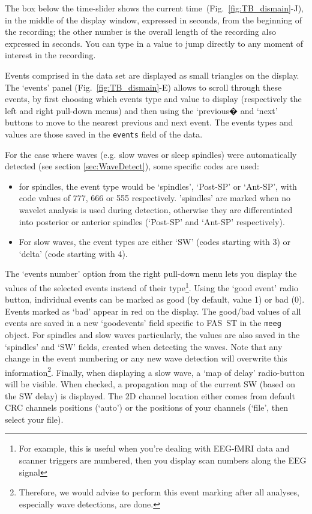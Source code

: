 \documentclass[a4paper,titlepage]{article}
\def\dblS{\hbox{S\hskip -4.5pt S}}
\newcommand{\bi}{\begin{itemize}}
\newcommand{\ei}{\end{itemize}}
\newcommand{\fasst}{FA\dblS T } 	%
\begin{document}
The box below the time-slider shows the current time~(Fig.~\ref{fig:TB_dismain}-J), in the middle of the display window, expressed in seconds, from the beginning of the recording; the other number is the overall length of the recording also expressed in seconds. You can type in a value to jump directly to any moment of interest in the recording.

Events comprised in the data set are displayed as small triangles on the display. The `events' panel  (Fig.~\ref{fig:TB_dismain}-E) allows to scroll through these events, by first choosing which events type and value to display (respectively the left and right pull-down menus) and then using the `previous� and `next' buttons to move to the nearest previous and next event. The events types and values are those saved in the {\tt events} field of the data.

For the case where waves (e.g. slow waves or sleep spindles) were automatically detected (see section \ref{sec:WaveDetect}), some specific codes are used:
\bi
\item for spindles, the event type would be `spindles', `Post-SP' or `Ant-SP', with code values of 777, 666 or 555 respectively. 'spindles' are marked when no wavelet analysis is used during detection, otherwise they are differentiated into posterior or anterior spindles (`Post-SP' and `Ant-SP' respectively). 
\item For slow waves, the event types are either `SW' (codes starting with 3) or `delta' (code starting with 4). 
\ei
The `events number' option from the right pull-down menu lets you display the values of the selected events instead of their type\footnote{For example, this is useful when you're dealing with EEG-fMRI data and scanner triggers are numbered, then you display scan numbers along the EEG signal}. Using the `good event' radio button, individual events can be marked as good (by default, value 1) or bad (0). Events marked as `bad' appear in red on the display. The good/bad values of all events are saved in a new `goodevents' field specific to \fasst in the {\tt meeg} object. For spindles and slow waves particularly, the values are also saved in the `spindles' and `SW' fields, created when detecting the waves. Note that any change in the event numbering or any new wave detection will overwrite this information\footnote{Therefore, we would advise to perform this event marking after all analyses, especially wave detections, are done.}. Finally, when displaying a slow wave, a `map of delay' radio-button will be visible. When checked, a propagation map of the current SW (based on the SW delay) is displayed. The 2D channel location either comes from default CRC channels positions (`auto') or the positions of your channels (`file', then select your file). 
\end{document}
